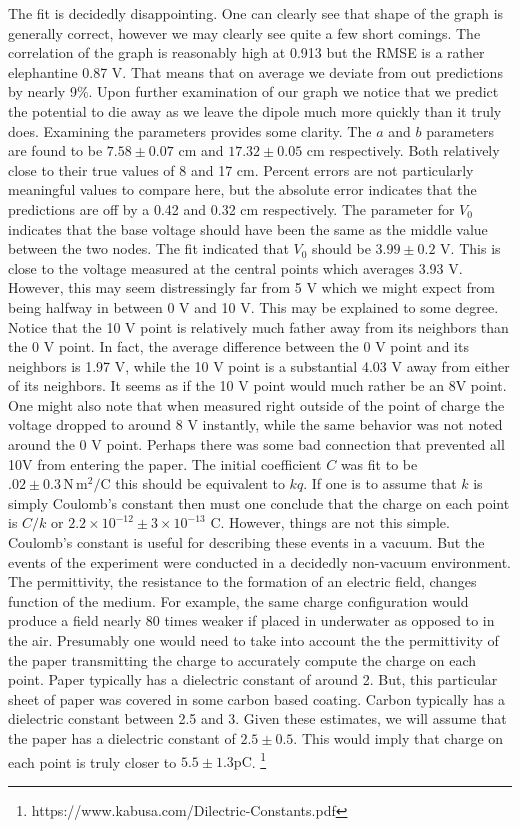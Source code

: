 \documentclass[11pt]{article}
\begin{document}
The fit is decidedly disappointing. One can clearly see that shape of the graph is generally correct, however we may clearly see quite a few short comings. The correlation of the graph is reasonably high at 0.913 but the RMSE is a rather elephantine 0.87 V. That means that on average we deviate from out predictions by nearly 9\%. Upon further examination of our graph we notice that we predict the potential to die away as we leave the dipole much more quickly than it truly does. Examining the parameters provides some clarity. The \(a\) and \(b\) parameters are found to be \(7.58 \pm 0.07\) cm and \(17.32 \pm 0.05\) cm respectively. Both relatively close to their true values of 8 and 17 cm. Percent errors are not particularly meaningful values to compare here, but the absolute error indicates that the predictions are off by a 0.42 and 0.32 cm respectively. The parameter for \(V_0\) indicates that the base voltage should have been the same as the middle value between the two nodes. The fit indicated that \(V_0\) should be \(3.99 \pm 0.2 \) V. This is close to the voltage measured at the central points which averages 3.93 V. However, this may seem distressingly far from 5 V which we might expect from being halfway in between 0 V and 10 V. This may be explained to some degree. Notice that the 10 V point is relatively much father away from its neighbors than the 0 V point. In fact, the average difference between the 0 V point and its neighbors is 1.97 V, while the 10 V point is a substantial 4.03 V away from either of its neighbors. It seems as if the 10 V point would much rather be an 8V point. One might also note that when measured right outside of the point of charge the voltage dropped to around 8 V instantly, while the same behavior was not noted around the 0 V point. Perhaps there was some bad connection that prevented all 10V from entering the paper. The initial coefficient \(C\) was fit to be \(.02	 \pm 0.3 \mathrm{\,N \,m^2 / C}\) this should be equivalent to \(k q\). If one is to assume that \(k\) is simply Coulomb's constant then must one conclude that the charge on each point is \(C/k\) or \(2.2 \times 10^{-12} \pm 3 \times 10^{-13} \) C. However, things are not this simple. Coulomb's constant is useful for describing these events in a vacuum. But the events of the experiment were conducted in a decidedly non-vacuum environment. The permittivity, the resistance to the formation of an electric field, changes function of the medium. For example, the same charge configuration would produce a field nearly 80 times weaker if placed in underwater as opposed to in the air. Presumably one would need to take into account the the permittivity of the paper transmitting the charge to accurately compute the charge on each point. Paper typically has a dielectric constant of around 2. But, this particular sheet of paper was covered in some carbon based coating. Carbon typically has a dielectric constant between 2.5 and 3. Given these estimates, we will assume that the paper has a dielectric constant of \(2.5 \pm 0.5\). This would imply that charge on each point is truly closer to \(5.5 \pm 1.3 \mathrm{p C}\).  \footnote{https://www.kabusa.com/Dilectric-Constants.pdf}
\end{document}
